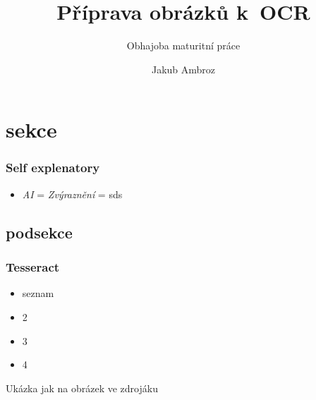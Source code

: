 \documentclass{beamer}
\title{Příprava obrázků k~OCR}
\subtitle{Obhajoba maturitní práce}
\author{Jakub Ambroz}
\begin{document}
	\begin{frame}
		\titlepage
	\end{frame}
\section{sekce}	
\begin{frame}
\frametitle{Self explenatory}
\begin{itemize}
\item \emph{AI} = \emph{Zvýraznění} = sds
\end{itemize}
\end{frame}
\subsection{podsekce}
\begin{frame}
\frametitle{Tesseract}
\begin{itemize}
\item seznam
\item 2
\item 3
\item 4
\end{itemize}
\end{frame}

\begin{frame}
    Ukázka jak na obrázek ve zdrojáku
\end{frame}
\end{document}
